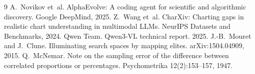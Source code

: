 \documentclass{article}
\begin{document}
\begin{thebibliography}{9}
 A.~Novikov et~al. AlphaEvolve: A coding agent for scientific and
algorithmic discovery. Google DeepMind, 2025.
 Z.~Wang et~al. CharXiv: Charting gaps in realistic chart understanding in
multimodal LLMs. NeurIPS Datasets and Benchmarks, 2024.
 Qwen Team. Qwen3-VL technical report. 2025.
 J.-B.~Mouret and J.~Clune. Illuminating search spaces by mapping elites.
arXiv:1504.04909, 2015.
 Q.~McNemar. Note on the sampling error of the difference between correlated
proportions or percentages. Psychometrika 12(2):153--157, 1947.
\end{thebibliography}
\end{document}
